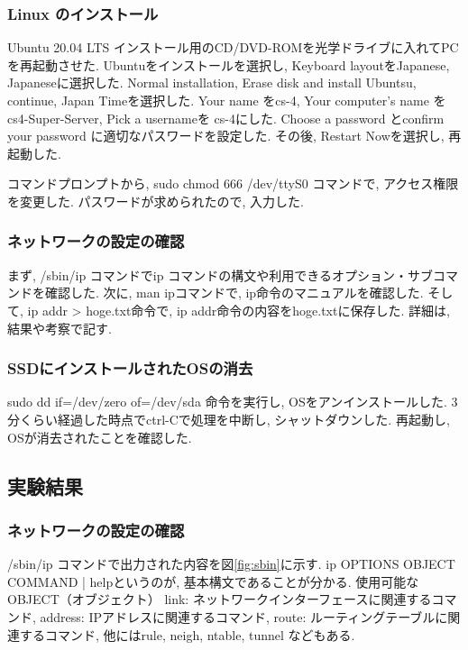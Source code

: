 \documentclass{ltjsarticle} %
\begin{document}
\subsubsection{Linux のインストール}

Ubuntu 20.04 LTS インストール用のCD/DVD-ROMを光学ドライブに⼊れてPCを再起動させた.
Ubuntuをインストールを選択し, Keyboard layoutをJapanese, Japaneseに選択した.
Normal installation, Erase disk and install Ubuntsu, continue, Japan Timeを選択した.
Your name をcs-4, Your computer's name をcs4-Super-Server, Pick a usernameを cs-4にした.
Choose a password とconfirm your password に適切なパスワードを設定した.
その後, Restart Nowを選択し, 再起動した. 

コマンドプロンプトから, sudo chmod 666 /dev/ttyS0 コマンドで, アクセス権限を変更した.
パスワードが求められたので, 入力した.

\subsubsection{ネットワークの設定の確認}

まず, /sbin/ip コマンドでip コマンドの構文や利用できるオプション・サブコマンドを確認した.
次に, man ipコマンドで, ip命令のマニュアルを確認した.
そして, ip addr > hoge.txt命令で, ip addr命令の内容をhoge.txtに保存した.
詳細は, 結果や考察で記す.

\subsubsection{SSDにインストールされたOSの消去}

sudo dd if=/dev/zero of=/dev/sda 命令を実行し, OSをアンインストールした.
3分くらい経過した時点でctrl-Cで処理を中断し, シャットダウンした.
再起動し, OSが消去されたことを確認した.


\subsection{実験結果}

\subsubsection{ネットワークの設定の確認}

/sbin/ip コマンドで出力された内容を図\ref{fig:sbin}に示す. 
ip  OPTIONS  OBJECT  COMMAND | helpというのが, 基本構文であることが分かる.
使用可能な OBJECT（オブジェクト）
link: ネットワークインターフェースに関連するコマンド, 
address: IPアドレスに関連するコマンド, 
route: ルーティングテーブルに関連するコマンド, 
他にはrule, neigh, ntable, tunnel などもある. 
\end{document}
